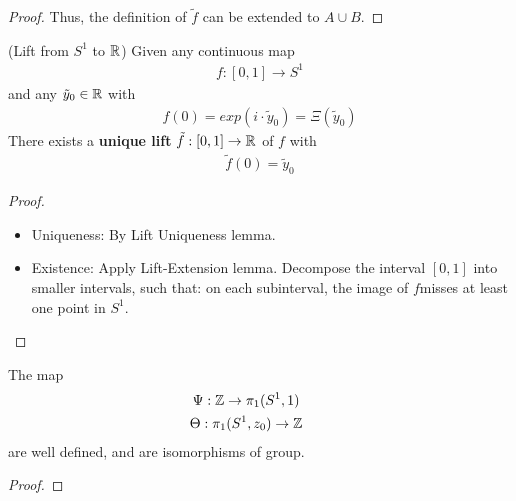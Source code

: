 \documentclass[Total.tex]{subfiles}
\begin{document}
\begin{itemize}
\begin{proof}
							Thus, the definition of $\tilde{f}$ can be extended to $A\cup B$. 
					\end{proof}
					
					\begin{lemma}
						(Lift from $S^1$ to $\mathbb{R}$) Given any continuous map 
						\begin{gather*}
							f:[0,1]\rightarrow S^1
						\end{gather*}
						and any $\tilde{y}_0\in \mathbb{R}$ with
						\begin{gather*}
							f(0)=exp(i\cdot \tilde{y}_0)=\Xi(\tilde{y}_0)
						\end{gather*}
						There exists a \textbf{unique lift} $\tilde{f}:[0,1]\rightarrow \mathbb{R}$ of $f$ with
						\begin{gather*}
							\tilde{f}(0)=\tilde{y}_0
						\end{gather*} 
					\end{lemma}
					\begin{proof}
						\begin{itemize}
							\item Uniqueness: By Lift Uniqueness lemma.
							\item Existence: Apply Lift-Extension lemma. Decompose the interval $[0,1]$ into smaller intervals, such that: on each subinterval, the image of $f$misses at least one point in $S^1$.
						\end{itemize}
					\end{proof}
					\begin{theorem}
						The map
						\begin{gather*}
							\Psi:\mathbb{Z}\rightarrow \pi_1(S^1,1)\qquad \\
							\Theta:\pi_1(S^1,z_0)\rightarrow \mathbb{Z}\qquad 
						\end{gather*}
						are well defined, and are isomorphisms of group.
					\end{theorem}
					\begin{proof}
						

\end{proof}
\end{itemize}
\end{document}
